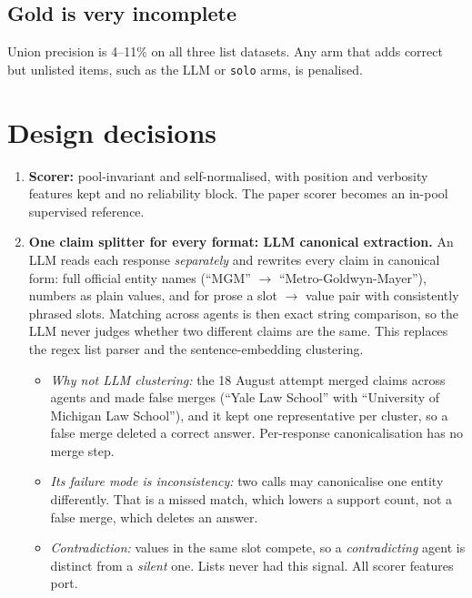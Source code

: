 \documentclass[11pt]{article}
\newcommand{\code}[1]{\texttt{#1}}
\begin{document}
\subsection{Gold is very incomplete}
Union precision is 4--11\% on all three list datasets. Any arm that adds
correct but unlisted items, such as the LLM or \code{solo} arms, is penalised.

\section{Design decisions}
\begin{enumerate}
  \item \textbf{Scorer:} pool-invariant and self-normalised, with position and
        verbosity features kept and no reliability block. The paper scorer
        becomes an in-pool supervised reference.
  \item \textbf{One claim splitter for every format: LLM canonical extraction.}
        An LLM reads each response \emph{separately} and rewrites every claim in
        canonical form: full official entity names (``MGM'' $\to$
        ``Metro-Goldwyn-Mayer''), numbers as plain values, and for prose a
        slot $\to$ value pair with consistently phrased slots. Matching across
        agents is then exact string comparison, so the LLM never judges whether
        two different claims are the same. This replaces the regex list parser
        and the sentence-embedding clustering.
        \begin{itemize}
          \item \emph{Why not LLM clustering:} the 18 August attempt merged
                claims across agents and made false merges (``Yale Law School''
                with ``University of Michigan Law School''), and it kept one
                representative per cluster, so a false merge deleted a correct
                answer. Per-response canonicalisation has no merge step.
          \item \emph{Its failure mode is inconsistency:} two calls may
                canonicalise one entity differently. That is a missed match,
                which lowers a support count, not a false merge, which deletes
                an answer.
          \item \emph{Contradiction:} values in the same slot compete, so a
                \emph{contradicting} agent is distinct from a \emph{silent} one.
                Lists never had this signal. All scorer features port.

\end{itemize}
\end{enumerate}
\end{document}
